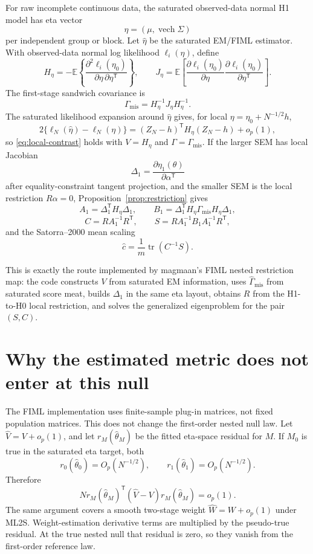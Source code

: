 \documentclass[11pt]{article}
\newcommand{\E}{\mathbb{E}}
\newcommand{\tr}{\operatorname{tr}}
\newcommand{\vech}{\operatorname{vech}}
\newcommand{\T}{^{\mathsf T}}
\newcommand{\op}{o_p}
\newcommand{\Op}{O_p}
\theoremstyle{plain}
\theoremstyle{remark}
\begin{document}
For raw incomplete continuous data, the saturated observed-data normal H1 model
has eta vector
\[
  \eta=(\mu,\vech\Sigma)
\]
per independent group or block. Let \(\hat\eta\) be the saturated EM/FIML
estimator. With observed-data normal log likelihood \(\ell_i(\eta)\), define
\[
  H_\eta
  =
  -\E\left\{\frac{\partial^2\ell_i(\eta_0)}
                  {\partial\eta\,\partial\eta\T}\right\},
  \qquad
  J_\eta
  =
  \E\left[
    \frac{\partial\ell_i(\eta_0)}{\partial\eta}
    \frac{\partial\ell_i(\eta_0)}{\partial\eta\T}
  \right].
\]
The first-stage sandwich covariance is
\[
  \Gamma_{\mathrm{mis}}=H_\eta^{-1}J_\eta H_\eta^{-1}.
\]
The saturated likelihood expansion around \(\hat\eta\) gives, for local
\(\eta=\eta_0+N^{-1/2}h\),
\[
  2\{\ell_N(\hat\eta)-\ell_N(\eta)\}
  =
  (Z_N-h)\T H_\eta (Z_N-h)+\op(1),
  \label{eq:fiml-local}
\]
so \eqref{eq:local-contrast} holds with \(V=H_\eta\) and
\(\Gamma=\Gamma_{\mathrm{mis}}\). If the larger SEM has local Jacobian
\[
  \Delta_1=\frac{\partial\eta_1(\theta)}{\partial\alpha\T}
\]
after equality-constraint tangent projection, and the smaller SEM is the local
restriction \(R\alpha=0\), Proposition~\ref{prop:restriction} gives
\[
  A_1=\Delta_1\T H_\eta\Delta_1,
  \qquad
  B_1=\Delta_1\T H_\eta\Gamma_{\mathrm{mis}}H_\eta\Delta_1,
\]
\[
  C=RA_1^{-1}R\T,
  \qquad
  S=RA_1^{-1}B_1A_1^{-1}R\T,
\]
and the Satorra--2000 mean scaling
\[
  \hat c=\frac{1}{m}\tr(C^{-1}S).
\]

This is exactly the route implemented by magmaan's FIML nested restriction map:
the code constructs \(V\) from saturated EM information, uses
\(\widehat\Gamma_{\mathrm{mis}}\) from saturated score meat, builds
\(\Delta_1\) in the same eta layout, obtains \(R\) from the H1-to-H0 local
restriction, and solves the generalized eigenproblem for the pair \((S,C)\).

\section{Why the estimated metric does not enter at this null}
\label{sec:estimated}

The FIML implementation uses finite-sample plug-in matrices, not fixed
population matrices. This does not change the first-order nested null law.
Let \(\hat V=V+\op(1)\), and let \(r_M(\hat\theta_M)\) be the fitted eta-space
residual for \(M\). If \(M_0\) is true in the saturated eta target, both
\[
  r_0(\hat\theta_0)=\Op(N^{-1/2}),\qquad
  r_1(\hat\theta_1)=\Op(N^{-1/2}).
\]
Therefore
\[
  N r_M(\hat\theta_M)\T(\hat V-V)r_M(\hat\theta_M)
  =
  \op(1).
\]
The same argument covers a smooth two-stage weight \(\hat W=W+\op(1)\) under
ML2S. Weight-estimation derivative terms are multiplied by the pseudo-true
residual. At the true nested null that residual is zero, so they vanish from
the first-order reference law.
\end{document}
